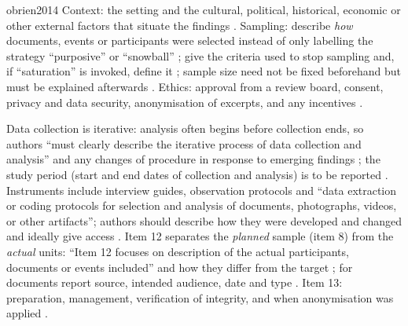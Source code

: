 \begin{papercard}{obrien2014}
 Context: the setting and the cultural, political, historical, economic or other external factors that situate the findings . Sampling: describe \emph{how} documents, events or participants were selected instead of only labelling the strategy ``purposive'' or ``snowball'' ; give the criteria used to stop sampling and, if ``saturation'' is invoked, define it ; sample size need not be fixed beforehand but must be explained afterwards . Ethics: approval from a review board, consent, privacy and data security, anonymisation of excerpts, and any incentives .

 Data collection is iterative: analysis often begins before collection ends, so authors ``must clearly describe the iterative process of data collection and analysis'' and any changes of procedure in response to emerging findings ; the study period (start and end dates of collection and analysis) is to be reported . Instruments include interview guides, observation protocols and ``data extraction or coding protocols for selection and analysis of documents, photographs, videos, or other artifacts''; authors should describe how they were developed and changed and ideally give access . Item 12 separates the \emph{planned} sample (item 8) from the \emph{actual} units: ``Item 12 focuses on description of the actual participants, documents or events included'' and how they differ from the target ; for documents report source, intended audience, date and type . Item 13: preparation, management, verification of integrity, and when anonymisation was applied .


\end{papercard}
